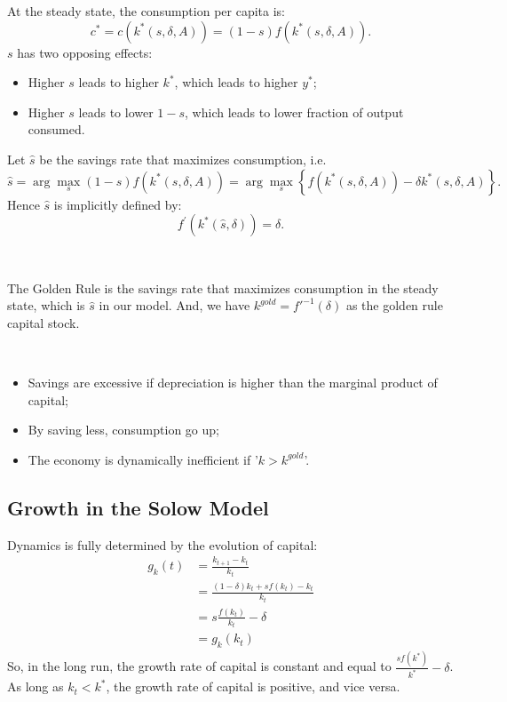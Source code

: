 At the steady state, the consumption per capita is:
\[c^* = c(k^*(s, \delta, A)) = (1-s) f(k^*(s, \delta, A)).\]
$s$ has two opposing effects:
\begin{itemize}
    \item Higher $s$ leads to higher $k^*$, which leads to higher $y^*$;
    \item Higher $s$ leads to lower $1-s$, which leads to lower fraction of output consumed.
\end{itemize}

Let $\hat{s}$ be the savings rate that maximizes consumption, i.e.
\[\hat{s} = \arg \max_s (1-s)f(k^*(s, \delta, A)) = \arg \max_{s} \left\{f(k^*(s, \delta, A)) - \delta k^*(s, \delta, A)\right\}.\]
Hence $\hat{s}$ is implicitly defined by:
\[f^{\prime} (k^*(\hat{s}, \delta)) = \delta. \]

\begin{definition}\label{Golden Rule}
    \

    The Golden Rule is the savings rate that maximizes consumption in the steady state,
    which is $\hat{s}$ in our model. And, we have $k^{gold} = f'^{-1}(\delta)$ as
    the golden rule capital stock.

    \begin{note}
        \ 

        \begin{itemize}
            \item Savings are excessive if depreciation is higher than the marginal
            product of capital;
            \item By saving less, consumption go up;
            \item The economy is dynamically inefficient if '$k>k^{gold}$'.
        \end{itemize}
    \end{note}
\end{definition}

\subsection{Growth in the Solow Model}

Dynamics is fully determined by the evolution of capital:
\begin{align*}
    g_k(t) &= \frac{k_{t+1} - k_t}{k_t}\\
    &= \frac{(1-\delta)k_t + sf(k_t) - k_t}{k_t}\\
    &= s\frac{f(k_t)}{k_t}-\delta\\
    &= g_k(k_t)
\end{align*}
So, in the long run, the growth rate of capital is constant and equal to $\frac{sf(k^*)}{k^*} - \delta$.
As long as $k_t<k^*$, the growth rate of capital is positive, and vice versa.

